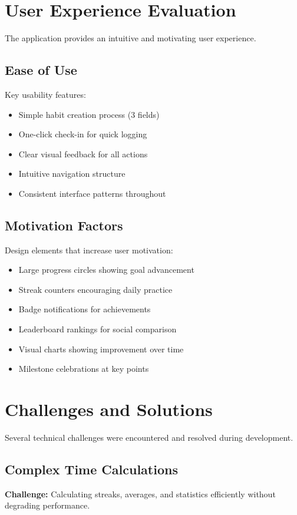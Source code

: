 \documentclass[12pt,a4paper]{report}
\newcommand{\JustifiedNormal}{\fontsize{12}{14}\selectfont\justifying\setlength{\parindent}{0pt}}
\begin{document}
\section{User Experience Evaluation}
\JustifiedNormal
The application provides an intuitive and motivating user experience.

\subsection{Ease of Use}
\JustifiedNormal
Key usability features:
\begin{itemize}
  \item Simple habit creation process (3 fields)
  \item One-click check-in for quick logging
  \item Clear visual feedback for all actions
  \item Intuitive navigation structure
  \item Consistent interface patterns throughout
\end{itemize}

\subsection{Motivation Factors}
\JustifiedNormal
Design elements that increase user motivation:
\begin{itemize}
  \item Large progress circles showing goal advancement
  \item Streak counters encouraging daily practice
  \item Badge notifications for achievements
  \item Leaderboard rankings for social comparison
  \item Visual charts showing improvement over time
  \item Milestone celebrations at key points
\end{itemize}

\section{Challenges and Solutions}
\JustifiedNormal
Several technical challenges were encountered and resolved during development.

\subsection{Complex Time Calculations}
\JustifiedNormal
\textbf{Challenge:} Calculating streaks, averages, and statistics efficiently without degrading performance.
\end{document}

